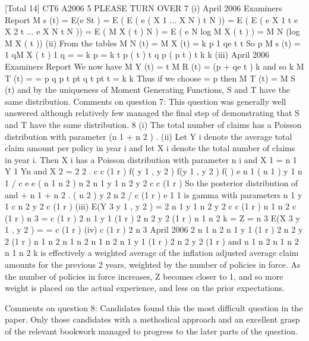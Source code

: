 \documentclass[a4paper,12pt]{article}
\begin{document}
[Total 14]
CT6 A2006 5
PLEASE TURN OVER
7
(i)
April 2006
Examiners Report
M s (t) = E(e St )
= E ( E ( e ( X 1
... X N ) t
N ))
= E ( E ( e X 1 t e X 2 t ... e X N t N ))
= E ( M X ( t ) N )
= E ( e N log M X ( t ) )
= M N (log M X ( t ))
(ii)
From the tables
M N (t) =
M X (t) =
k
p
1 qe t
t
So
p
M s (t) =
1 qM X ( t )
1 q
=
=
k
p
=
k
t
p ( t )
t q
p (
p t )
t
k
k
(iii)
April 2006
Examiners Report
We now have
M Y (t) =
t
M R (t) = (p + qe t ) k
and so
k
M T (t) =
=
p q
p
t
pt q
t
pt
t
=
k
k
Thus if we choose = p then M T (t) = M S (t) and by the uniqueness of
Moment Generating Functions, S and T have the same distribution.
Comments on question 7: This question was generally well answered although relatively few
managed the final step of demonstrating that S and T have the same distribution.
8
(i) The total number of claims has a Poisson distribution with parameter
(n 1 + n 2 ) .
(ii) Let Y i denote the average total claim amount per policy in year i and let X i
denote the total number of claims in year i. Then X i has a Poisson distribution
with parameter n i and
X 1 =
n 1 Y 1
Yn
and X 2 = 2 2 .
c
c (1 r )
f( y 1 , y 2 )
f(y 1 , y 2 ) f( )
e n 1 ( n 1 ) y 1 n 1 / c e
e ( n 1 n 2 )
n 2
n 1 y 1 n 2 y 2
c c (1 r )
So the posterior distribution of
and
+ n 1 + n 2 .
( n 2 ) y 2 n 2 / c (1
r )
e
1
1
is gamma with parameters
n 1 y 1
c
n 2 y 2
c (1 r )%
(iii)
E(Y 3 y 1 , y 2 ) =
2
n 1 y 1
n 2 y 2
c
c (1 r )
n 1 n 2
c (1 r )
n 3
= c (1 r ) 2 n 1 y 1 (1 r ) 2 n 2 y 2 (1 r )
n 1 n 2
k =
Z =
n 3
E(X 3 y 1 , y 2 )
=
= c (1 r )
(iv)
c (1 r ) 2
n 3
April 2006
2
n 1 n 2
n 1 y 1 (1 r ) 2 n 2 y 2 (1 r )
n 1 n 2
n 1 n 2
n 1 n 2
n 1 y 1 (1 r ) 2 n 2 y 2 (1 r )
and
n 1 n 2
n 1 n 2
n 1 n 2
k is effectively a weighted average of the inflation adjusted average claim amounts for the previous 2 years, weighted by the number of policies in force. As the number of policies in force increases, Z becomes closer to 1, and so more weight is placed on the actual experience, and less on the prior expectations.

Comments on question 8: Candidates found this the most difficult question in the paper.
Only those candidates with a methodical approach and an excellent grasp of the relevant bookwork managed to progress to the later parts of the question.
\end{document}
